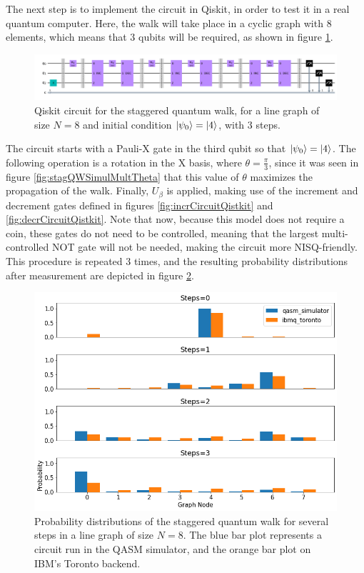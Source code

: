\documentclass[../../dissertation.tex]{subfiles}
\begin{document}
The next step is to implement the circuit in Qiskit, in order to test it in a
real quantum computer. Here, the walk will take place in a cyclic graph with
$8$ elements, which means that 3 qubits will be required, as shown in figure
\ref{fig:stagQWCircuitQistkit}.
\begin{figure}[!h]
	\centering
	\includegraphics[scale=0.32]{img/Qiskit/StaggeredQW/Circuits/circStagQW_N3_S3.png}
	\caption{Qiskit circuit for the staggered quantum walk, for a line graph of size $N=8$ and initial condition $\ket{\psi_0}=\ket{4}$, with $3$ steps.} 
	\label{fig:stagQWCircuitQistkit}
\end{figure}
The circuit starts with a Pauli-X gate in the third qubit so that $\ket{\psi_0}
= \ket{4}$. The following operation is a rotation in the X basis, where $\theta
= \frac{\pi}{3}$, since it was seen in figure \ref{fig:stagQWSimulMultTheta}
that this value of $\theta$ maximizes the propagation of the walk. Finally,
$U_\beta$ is applied, making use of the increment and decrement gates defined
in figures \ref{fig:incrCircuitQistkit} and \ref{fig:decrCircuitQistkit}. Note
that now, because this model does not require a coin, these gates do not need
to be controlled, meaning that the largest multi-controlled NOT gate will not
be needed, making the circuit more NISQ-friendly. This procedure is repeated
$3$ times, and the resulting probability distributions after measurement are depicted in figure \ref{fig:stagQWQiskitDist}. 
\begin{figure}[!h]
	\centering
	\includegraphics[scale=0.40]{img/Qiskit/StaggeredQW/StagQW_N3_S0123.png}
	\caption{Probability distributions of the staggered quantum walk for several steps in a line graph of size $N=8$. The blue bar plot represents a circuit run in the QASM simulator, and the orange bar plot on IBM's Toronto backend.} 
	\label{fig:stagQWQiskitDist}
\end{figure}\par
\end{document}
